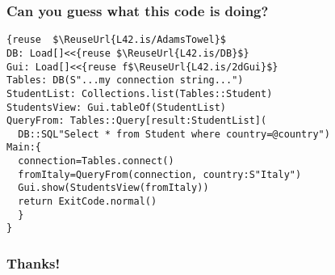 \begin{frame}[fragile]
\frametitle{Can you guess what this code is doing?}
\begin{NiceCode}{59ex}{1}
\begin{lstlisting}
{reuse  $\ReuseUrl{L42.is/AdamsTowel}$
DB: Load[]<<{reuse $\ReuseUrl{L42.is/DB}$}
Gui: Load[]<<{reuse f$\ReuseUrl{L42.is/2dGui}$}
Tables: DB(S"...my connection string...")
StudentList: Collections.list(Tables::Student)
StudentsView: Gui.tableOf(StudentList)
QueryFrom: Tables::Query[result:StudentList](
  DB::SQL"Select * from Student where country=@country")
Main:{
  connection=Tables.connect()
  fromItaly=QueryFrom(connection, country:S"Italy")
  Gui.show(StudentsView(fromItaly))
  return ExitCode.normal()
  }
}
\end{lstlisting}
\end{NiceCode}
\end{frame}



\begin{frame}[fragile]
\frametitle{ Thanks! }
\end{frame}

